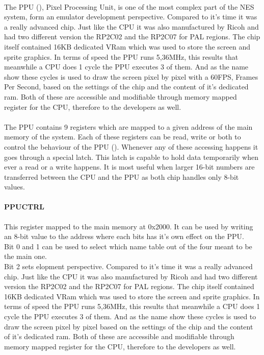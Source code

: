 \documentclass[]{report}
\begin{document}
\paragraph{ }
The PPU (\cite{NDPP}), Pixel Processing Unit, is one of the most complex part of the NES system, form an emulator development perspective. Compared to it's time it was a really advanced chip. Just like the CPU it was also manufactured by Ricoh and had two different version the RP2C02 and the RP2C07 for PAL regions. The chip itself contained 16KB dedicated VRam which was used to store the screen and sprite graphics. In terms of speed the PPU runs 5,36MHz, this results that meanwhile a CPU does 1 cycle the PPU executes 3 of them. And as the name show these cycles is used to draw the screen pixel by pixel with a 60FPS, Frames Per Second, based on the settings of the chip and the content of it's dedicated ram. Both of these are accessible and modifiable through memory mapped register for the CPU, therefore to the developers as well.

\paragraph{ }
The PPU contains 9 registers which are mapped to a given address of the main memory of the system. Each of these registers can be read, write or  both to control the behaviour of the PPU (\cite{PPRG}). Whenever any of these accessing happens it goes through a special latch. This latch is capable to hold data temporarily when ever a read or a write happens. It is most useful when larger 16-bit numbers are transferred between the CPU and the PPU as both chip handles only 8-bit values.

\paragraph{PPUCTRL}
This register mapped to the main memory at 0x2000. It can be used by writing an 8-bit value to the address where  each bits has it's own effect on the PPU.
\\
Bit 0 and 1 can be used to select which name table out of the four meant to be the main one.
\\
Bit 2 sets elopment perspective. Compared to it's time it was a really advanced chip. Just like the CPU it was also manufactured by Ricoh and had two different version the RP2C02 and the RP2C07 for PAL regions. The chip itself contained 16KB dedicated VRam which was used to store the screen and sprite graphics. In terms of speed the PPU runs 5,36MHz, this results that meanwhile a CPU does 1 cycle the PPU executes 3 of them. And as the name show these cycles is used to draw the screen pixel by pixel based on the settings of the chip and the content of it's dedicated ram. Both of these are accessible and modifiable through memory mapped register for the CPU, therefore to the developers as well.
\end{document}
